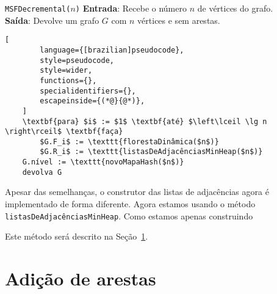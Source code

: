 \begin{programruledcaption}{\texttt{MSFDecremental($n$)} \label{prog:newDecrementalMSF}}
    \noindent\textbf{Entrada}: Recebe o número $n$ de vértices do grafo. \\
    \textbf{Saída}: Devolve um grafo $G$ com $n$ vértices e sem arestas.
    \vspace{-0.5\baselineskip}
    \begin{lstlisting}[
        language={[brazilian]pseudocode},
        style=pseudocode,
        style=wider,
        functions={},
        specialidentifiers={},
        escapeinside={(*@}{@*)},
    ]
    \textbf{para} $i$ := $1$ \textbf{até} $\left\lceil \lg n \right\rceil$ \textbf{faça}
        $G.F_i$ := \texttt{florestaDinâmica($n$)}
        $G.R_i$ := \texttt{listasDeAdjacênciasMinHeap($n$)}
    G.nível := \texttt{novoMapaHash($n$)}
    devolva G
    \end{lstlisting}
    \vspace{-0.5\baselineskip}
\end{programruledcaption}

Apesar das semelhanças, o construtor das listas de adjacências agora é implementado de forma diferente. Agora estamos usando o método \texttt{listasDeAdjacênciasMinHeap}. Como estamos apenas construindo 

Este método será descrito na Seção~\ref{sec:edge-addition-DecrementalMSF}. 

\section{Adição de arestas}
\label{sec:edge-addition-DecrementalMSF}
